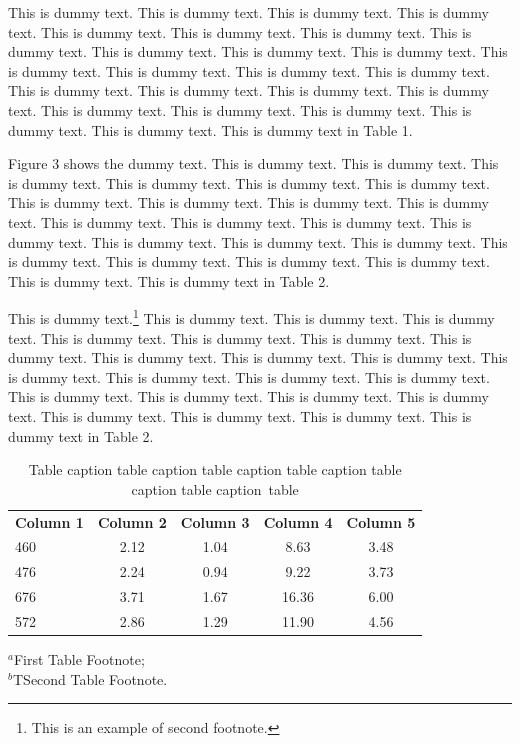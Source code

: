 \documentclass{jpp}
\begin{document}
This is dummy text. This is dummy text. This is dummy text. This is dummy text. This is
dummy text. This is dummy text. This is dummy text. This is dummy text. This is dummy
text. This is dummy text. This is dummy text. This is dummy text. This is dummy text. This
is dummy text. This is dummy text. This is dummy text. This is dummy text. This is dummy
text. This is dummy text. This is dummy text. This is dummy text. This is dummy text. This
is dummy text. This is dummy text. This is dummy text in Table 1.

Figure 3 shows the dummy text. This is dummy text. This is dummy text. This is dummy
text. This is dummy text. This is dummy text. This is dummy text. This is dummy text. This
is dummy text. This is dummy text. This is dummy text. This is dummy text. This is dummy
text. This is dummy text. This is dummy text. This is dummy text. This is dummy text. This
is dummy text. This is dummy text. This is dummy text. This is dummy text. This is dummy
text. This is dummy text. This is dummy text in Table 2.

This is dummy text.\footnote{This is an example of second footnote.} This is dummy text. This is dummy text. This is dummy text. This
is dummy text. This is dummy text. This is dummy text. This is dummy text. This is dummy
text. This is dummy text. This is dummy text. This is dummy text. This is dummy text. This
is dummy text. This is dummy text. This is dummy text. This is dummy text. This is dummy
text. This is dummy text. This is dummy text. This is dummy text. This is dummy text. This
is dummy text in Table 2.


\begin{table}
\begin{center}
\caption{Table caption table caption table caption table
caption table caption table caption~table}
{\begin{tabular}{lcccc}
\textbf{Column 1} & \textbf{Column 2}  & \textbf{Column 3}  & \textbf{Column 4}  & \textbf{Column 5}\\[6pt]
460  & 2.12  & 1.04  & 8.63  & 3.48\\
476  & 2.24  & 0.94  & 9.22  & 3.73\\
676  & 3.71  & 1.67  & 16.36  & 6.00\\
572  & 2.86  & 1.29  & 11.90  & 4.56\\[6pt]
\end{tabular}}{\par $^{a}$First Table Footnote;\\
$^{b}$TSecond Table Footnote.\\}
\end{center}
\end{table}
\end{document}
